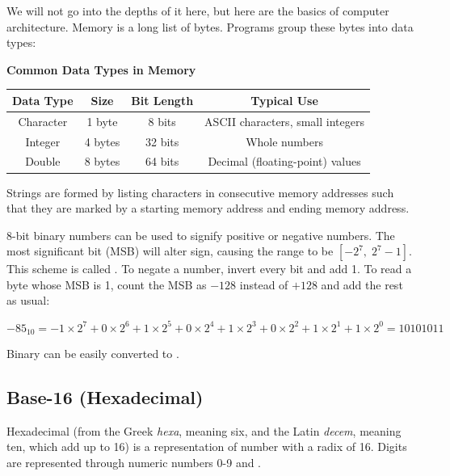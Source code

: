 We will not go into the depths of it here, but here are the basics of computer architecture. 
Memory is a long list of bytes. 
Programs group these bytes into data types:


\textbf{Common Data Types in Memory}

\begin{center}
  
  \begin{tabular}{|c|c|c|c|}
  \hline
  \textbf{Data Type} & \textbf{Size} & \textbf{Bit Length} & \textbf{Typical Use} \\
  \hline
  Character & 1 byte & 8 bits & ASCII characters, small integers \\
  \hline
  Integer & 4 bytes & 32 bits & Whole numbers \\
  \hline
  Double & 8 bytes & 64 bits & Decimal (floating-point) values \\
  \hline
  \end{tabular}
\end{center}


Strings are formed by listing characters in consecutive memory addresses such that they are marked by a starting memory address and ending memory address. 

8-bit binary numbers can be used to signify positive or negative numbers.  
The most significant bit (MSB) will alter sign, causing the range to be $[-2^{7}, \; 2^{7}-1]$. This scheme is called . To negate a number, invert every bit and add 1. To read a byte whose MSB is 1, count the MSB as $-128$ instead of $+128$ and add the rest as usual: 

\[
-85_{10} = -1 \times 2^7 + 0 \times 2^6 + 1 \times 2^5 + 0 \times 2^4 + 1 \times 2^3 + 0 \times 2^2 + 1 \times 2^1 + 1 \times 2^0 = 1010 1011
\]

Binary can be easily converted to . 

\subsection{Base-16 (Hexadecimal)}
Hexadecimal (from the Greek \emph{hexa}, meaning six, and the Latin \emph{decem}, meaning ten, which add up to 16) is a representation of number with a radix of 16. Digits are represented through numeric numbers 0-9 and . 

